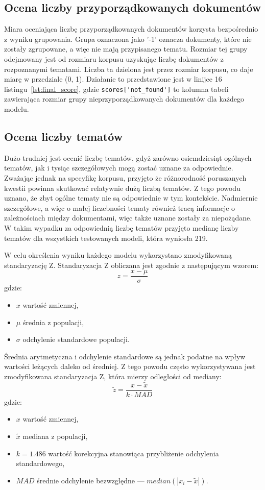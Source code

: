 	\subsection{Ocena liczby przyporządkowanych dokumentów}\label{sec:score_not_found}
		Miara oceniająca liczbę przyporządkowanych dokumentów korzysta bezpośrednio z wyniku grupowania.
		Grupa oznaczona jako '-1' oznacza dokumenty, które nie zostały zgrupowane, a więc nie mają przypisanego tematu.
		Rozmiar tej grupy odejmowany jest od rozmiaru korpusu uzyskując liczbę dokumentów z rozpoznanymi tematami.
		Liczba ta dzielona jest przez rozmiar korpusu, co daje miarę w przedziale (0, 1).
		Działanie to przedstawione jest w linijce 16 listingu~\ref{lst:final_score},
			gdzie \verb|scores['not_found']| to kolumna tabeli zawierająca rozmiar grupy nieprzyporządkowanych dokumentów dla każdego modelu.

	\subsection{Ocena liczby tematów}
		Dużo trudniej jest ocenić liczbę tematów, gdyż zarówno osiemdziesiąt ogólnych tematów,
			jak i tysiąc szczegółowych mogą zostać uznane za odpowiednie.
		Zważając jednak na specyfikę korpusu, przyjęto że różnorodność poruszanych kwestii powinna skutkować relatywnie dużą liczbą tematów.
		Z tego powodu uznano, że zbyt ogólne tematy nie są odpowiednie w tym kontekście.
		Nadmiernie szczegółowe, a więc o małej liczebności tematy również tracą informacje o zależnościach między dokumentami,
			więc także uznane zostały za niepożądane.
		W takim wypadku za odpowiednią liczbę tematów przyjęto medianę liczby tematów dla wszystkich testowanych modeli, która wyniosła 219.

		W celu określenia wyniku każdego modelu wykorzystano zmodyfikowaną standaryzację Z.
		Standaryzacja Z obliczana jest zgodnie z następującym wzorem:
		\[z=\frac{x-\mu}{\sigma}\]
		gdzie:
		\begin{itemize}
			\item \(x\) wartość zmiennej,
			\item \(\mu\) średnia z populacji,
			\item \(\sigma\) odchylenie standardowe populacji.
		\end{itemize}
		
		Średnia arytmetyczna i odchylenie standardowe są jednak podatne na wpływ wartości leżących daleko od średniej.
		Z tego powodu często wykorzystywana jest zmodyfikowana standaryzacja Z, która mierzy odległości od mediany:
		\[\tilde{z}=\frac{x-\tilde{x}}{k\cdot MAD}\]
		gdzie:
		\begin{itemize}
			\item \(x\) wartość zmiennej,
			\item \(\tilde{x}\) mediana z populacji,
			\item \(k=1.486\) wartość korekcyjna stanowiąca przybliżenie odchylenia standardowego,
			\item \(MAD\) średnie odchylenie bezwzględne --- \(median\left(|x_i-\tilde{x}|\right)\).
		\end{itemize}

